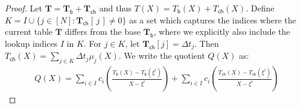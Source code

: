 \documentclass[sigconf]{acmart}
\renewcommand{\vec}{\mathbf} %
\newcommand{\vecT}{\vec{T}}
\newcommand{\setind}{I}
\newcommand{\vecTbase}{\vec{T}_{\mathsf{b}}}
\newcommand{\vecTcache}{\vec{T}_{\mathsf{ch}}}
\newcommand{\Tbasepoly}[1]{T_{\mathsf{b}}({#1})}
\newcommand{\Tcachepoly}[1]{T_{\mathsf{ch}}({#1})}
\newcommand{\Gtwo}{\mathbb{G}_2}
\providecommand{\DIFaddbegin}{} %
\providecommand{\DIFaddend}{} %
\providecommand{\DIFdelbegin}{} %
\providecommand{\DIFdelend}{} %
\newcommand{\DIFscaledelfig}{0.5}
\newlength{\DIFdelgraphicswidth} %
\newlength{\DIFdelgraphicsheight} %
\newcommand{\DIFaddincludegraphics}[2][]{{\color{blue}\fbox{\DIFOincludegraphics[#1]{#2}}}} %
\newcommand{\DIFdelincludegraphics}[2][]{%
	\sbox{\DIFdelgraphicsbox}{\DIFOincludegraphics[#1]{#2}}%
	\settoboxwidth{\DIFdelgraphicswidth}{\DIFdelgraphicsbox} %
	\settoboxtotalheight{\DIFdelgraphicsheight}{\DIFdelgraphicsbox} %
	\scalebox{\DIFscaledelfig}{%
		\parbox[b]{\DIFdelgraphicswidth}{\usebox{\DIFdelgraphicsbox}\\[-\baselineskip] \rule{\DIFdelgraphicswidth}{0em}}\llap{\resizebox{\DIFdelgraphicswidth}{\DIFdelgraphicsheight}{%
				\setlength{\unitlength}{\DIFdelgraphicswidth}%
				\begin{picture}(1,1)%
					\thicklines\linethickness{2pt} %
					{\color[rgb]{1,0,0}\put(0,0){\framebox(1,1){}}}%
					{\color[rgb]{1,0,0}\put(0,0){\line( 1,1){1}}}%
					{\color[rgb]{1,0,0}\put(0,1){\line(1,-1){1}}}%
				\end{picture}%
			}\hspace*{3pt}}} %
} %
\DeclareRobustCommand{\DIFaddbegin}{\DIFOaddbegin \let\includegraphics\DIFaddincludegraphics} %
\DeclareRobustCommand{\DIFaddend}{\DIFOaddend \let\includegraphics\DIFOincludegraphics} %
\DeclareRobustCommand{\DIFdelbegin}{\DIFOdelbegin \let\includegraphics\DIFdelincludegraphics} %
\DeclareRobustCommand{\DIFdelend}{\DIFOaddend \let\includegraphics\DIFOincludegraphics} %
\begin{document}
	\begin{proof}
		Let $\vecT=\vecTbase+\vecTcache$ and thus $T(X)=\Tbasepoly{X}+\Tcachepoly{X}$.
		Define $K=I\cup \{j\in [N]: \vecTcache[\,j\,]\neq 0\}$ as a set which captures the indices where the current table $\vecT$ differs from the base $\vecTbase$,
		where we explicitly also include the lookup indices $I$ in $K$. For $j\in K$, let $\vecTcache[j]=\Delta t_j$. Then $\Tcachepoly{X}=\sum_{j\in K}\Delta t_j\mu_j(X)$.
		We write the quotient $Q(X)$ as:
		{
			\DIFdelbegin %
			\DIFdelend \begin{equation*}
				\DIFdelbegin %
				\DIFdelend \DIFaddbegin \begin{aligned}
					Q(X) = \sum_{i\in \setind}c_i\left(\frac{\Tbasepoly{X} - \Tbasepoly{\xi^i}}{X-\xi^i}\right)
					+ \sum_{i\in \setind}c_i\left(\frac{\Tcachepoly{X} - \Tcachepoly{\xi^i}}{X-\xi^i}\right)
				\end{aligned}\DIFaddend 
			\end{equation*}
		}
		\DIFdelbegin %
		

\end{proof}
\end{document}
